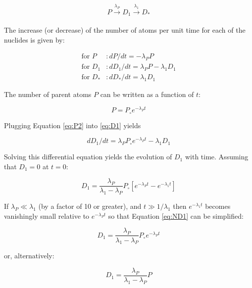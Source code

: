 \begin{equation}
P \xrightarrow[]{\lambda_P} D_1 \xrightarrow[]{\lambda_1} D_*
\label{eq:series}
\end{equation}

The increase (or decrease) of the number of atoms per unit time for
each of the nuclides is given by:

\begin{align}
\mbox{for~} P &: dP/dt = -\lambda_P P \label{eq:P1}\\
\mbox{for~} D_1 &: dD_1/dt = \lambda_P P - \lambda_1 D_1 \label{eq:D1}\\
\mbox{for~} D_* &: dD_*/dt = \lambda_1 D_1 \label{eq:D*}
\end{align}

The number of parent atoms $P$ can be written as a function of $t$:

\begin{equation}
P = P_\circ e^{-\lambda_P t}
\label{eq:P2}
\end{equation}

Plugging Equation \ref{eq:P2} into \ref{eq:D1} yields

\begin{equation}
dD_1/dt = \lambda_P P_\circ e^{-\lambda_P t} - \lambda_1 D_1
\label{eq:dD1dt}
\end{equation}

Solving this differential equation yields the evolution of $D_1$ with
time. Assuming that $D_1=0$ at $t=0$:

\begin{equation}
D_1 = \frac{\lambda_P}{\lambda_1 - \lambda_P} P_\circ \left[
  e^{-\lambda_P t} - e^{-\lambda_1 t}\right]
\label{eq:ND1}
\end{equation}

If $\lambda_P \ll \lambda_1$ (by a factor of 10 or greater), and $t
\gg 1/\lambda_1$ then $e^{-\lambda_1 t}$ becomes vanishingly small
relative to $e^{-\lambda_P t}$ so that Equation \ref{eq:ND1} can be
simplified:

\begin{equation}
D_1 = \frac{\lambda_P}{\lambda_1 - \lambda_P} P_\circ e^{-\lambda_P t}
\label{eq:ND1b}
\end{equation}

\noindent or, alternatively:

\begin{equation}
D_1 = \frac{\lambda_P}{\lambda_1 - \lambda_P} P
\label{eq:ND1c}
\end{equation}

